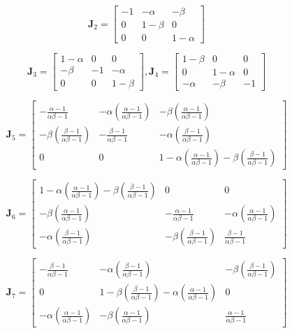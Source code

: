 \documentclass[twocolumn,aps,prl]{revtex4-1}
\newcommand{\talf}{\frac{\alpha - 1}{\alpha \beta - 1} }
\newcommand{\tbet}{\frac{\beta  - 1}{\alpha \beta - 1} }
\begin{document}
$$
\mathbf{J}_2 = 
\begin{bmatrix}
    -1 & - \alpha & - \beta \\
    0 & 1-\beta & 0 \\
    0 & 0 & 1- \alpha
\end{bmatrix}
$$

$$
\mathbf{J}_3 = 
\begin{bmatrix}
    1 - \alpha  & 0 & 0 \\
    - \beta & -1 & - \alpha \\
    0 & 0 & 1  - \beta
\end{bmatrix}
,
\mathbf{J}_4 = 
\begin{bmatrix}
    1 - \beta  & 0 & 0 \\
    0 & 1 -\alpha  & 0 \\
    - \alpha  & -\beta & -1
\end{bmatrix}
$$

$$
\mathbf{J}_5 = 
\begin{bmatrix}
    -\talf  & - \alpha (\talf)& - \beta (\talf)\\
    - \beta (\tbet) & -\tbet & - \alpha (\tbet) \\
    0 & 0 & 1 - \alpha (\talf) - \beta (\tbet)
\end{bmatrix}
$$

$$
\mathbf{J}_6 = 
\begin{bmatrix}
    1 - \alpha (\talf) - \beta (\tbet) & 0 & 0 \\
    - \beta (\talf) & -\talf & - \alpha (\talf) \\
    - \alpha (\tbet) & - \beta (\tbet) & \tbet
\end{bmatrix}
$$

$$
\mathbf{J}_7 = 
\begin{bmatrix}
    -\tbet & - \alpha (\tbet) & - \beta (\tbet) \\
    0 & 1 - \beta (\tbet) - \alpha (\talf) & 0 \\
    - \alpha (\talf) & - \beta (\talf) & \talf
\end{bmatrix}
$$
\end{document}
